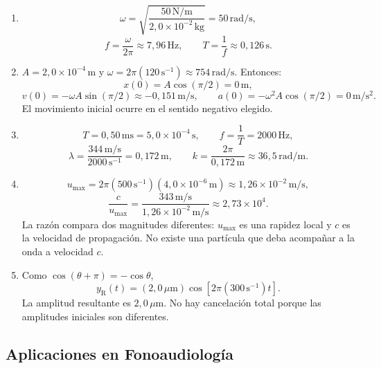 \begin{enumerate}[label=\textbf{N\arabic*.},leftmargin=*]
    \item
    \[
        \omega=\sqrt{\frac{50\,\text{N}/\text{m}}
                           {2{,}0\times10^{-2}\,\text{kg}}}
               =50\,\text{rad}/\text{s},
    \]
    \[
        f=\frac{\omega}{2\pi}\approx7{,}96\,\text{Hz},
        \qquad
        T=\frac{1}{f}\approx0{,}126\,\text{s}.
    \]

    \item \(A=2{,}0\times10^{-4}\,\text{m}\) y
    \(\omega=2\pi(120\,\text{s}^{-1})
    \approx754\,\text{rad}/\text{s}\). Entonces:
    \[
        x(0)=A\cos(\pi/2)=0\,\text{m},
    \]
    \[
        v(0)=-\omega A\sin(\pi/2)
             \approx-0{,}151\,\text{m}/\text{s},
        \qquad
        a(0)=-\omega^{2}A\cos(\pi/2)
             =0\,\text{m}/\text{s}^{2}.
    \]
    El movimiento inicial ocurre en el sentido negativo elegido.

    \item
    \[
        T=0{,}50\,\text{ms}
          =5{,}0\times10^{-4}\,\text{s},
        \qquad
        f=\frac{1}{T}=2000\,\text{Hz},
    \]
    \[
        \lambda=\frac{344\,\text{m}/\text{s}}
                       {2000\,\text{s}^{-1}}
               =0{,}172\,\text{m},
        \qquad
        k=\frac{2\pi}{0{,}172\,\text{m}}
          \approx36{,}5\,\text{rad}/\text{m}.
    \]

    \item
    \[
        u_{\max}
          =2\pi(500\,\text{s}^{-1})
           (4{,}0\times10^{-6}\,\text{m})
          \approx1{,}26\times10^{-2}\,\text{m}/\text{s},
    \]
    \[
        \frac{c}{u_{\max}}
          =\frac{343\,\text{m}/\text{s}}
                 {1{,}26\times10^{-2}\,\text{m}/\text{s}}
          \approx2{,}73\times10^{4}.
    \]
    La razón compara dos magnitudes diferentes: \(u_{\max}\) es una rapidez
    local y \(c\) es la velocidad de propagación. No existe una partícula que
    deba acompañar a la onda a velocidad \(c\).

    \item Como
    \(\cos(\theta+\pi)=-\cos\theta\),
    \[
        y_\mathrm{R}(t)
          =(2{,}0\,\mu\text{m})
          \cos\left[2\pi(300\,\text{s}^{-1})t\right].
    \]
    La amplitud resultante es \(2{,}0\,\mu\text{m}\). No hay cancelación total
    porque las amplitudes iniciales son diferentes.
\end{enumerate}

\subsection*{Aplicaciones en Fonoaudiología}

